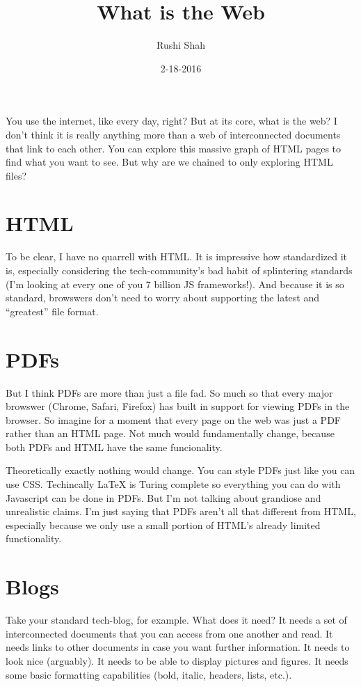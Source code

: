 \documentclass[12pt]{article}
\title{What is the Web}
\author{Rushi Shah}
\date{2-18-2016}
\begin{document}
  \maketitle


  You use the internet, like every day, right? But at its core, what is the web? I don't think it is really anything more than a web of interconnected documents that link to each other. You can explore this massive graph of HTML pages to find what you want to see. But why are we chained to only exploring HTML files?

  \section{HTML}

  To be clear, I have no quarrell with HTML. It is impressive how standardized it is, especially considering the tech-community's bad habit of splintering standards (I'm looking at every one of you 7 billion JS frameworks!). And because it is so standard, browswers don't need to worry about supporting the latest and ``greatest'' file format.

  \section{PDFs}

  But I think PDFs are more than just a file fad. So much so that every major browswer (Chrome, Safari, Firefox) has built in support for viewing PDFs in the browser. So imagine for a moment that every page on the web was just a PDF rather than an HTML page. Not much would fundamentally change, because both PDFs and HTML have the same funcionality. 

  Theoretically exactly nothing would change. You can style PDFs just like you can use CSS. Techincally LaTeX is Turing complete so everything you can do with Javascript can be done in PDFs. But I'm not talking about grandiose and unrealistic claims. I'm just saying that PDFs aren't all that different from HTML, especially because we only use a small portion of HTML's already limited functionality. 

  \section{Blogs}

  Take your standard tech-blog, for example. What does it need? It needs a set of interconnected documents that you can access from one another and read. It needs links to other documents in case you want further information. It needs to look nice (arguably). It needs to be able to display pictures and figures. It needs some basic formatting capabilities (bold, italic, headers, lists, etc.). 
\end{document}
